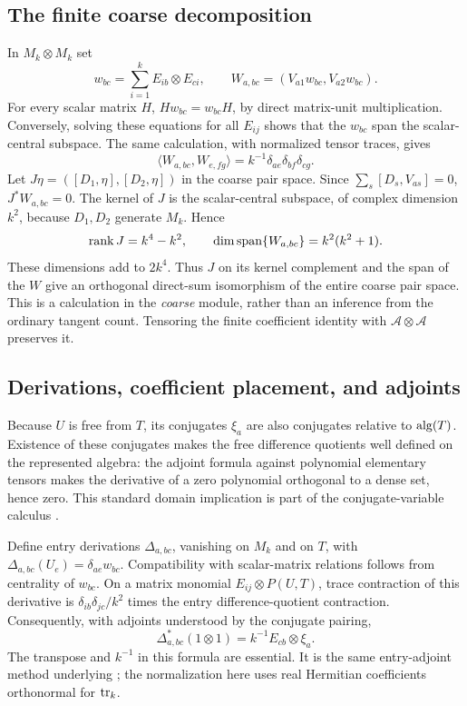 \documentclass[11pt]{article}
\theoremstyle{definition}\newtheorem{definition}[theorem]{Definition}
\theoremstyle{remark}\newtheorem{remark}[theorem]{Remark}
\begin{document}
\subsection{The finite coarse decomposition}
In $M_k\otimes M_k$ set
\[
 w_{bc}=\sum_{i=1}^k E_{ib}\otimes E_{ci},\qquad
 W_{a,bc}=(V_{a1}w_{bc},V_{a2}w_{bc}).
\]
For every scalar matrix $H$, $Hw_{bc}=w_{bc}H$, by direct
matrix-unit multiplication. Conversely, solving these equations for
all $E_{ij}$ shows that the $w_{bc}$ span the scalar-central subspace.
The same calculation, with normalized tensor traces, gives
\begin{equation}\label{eq:gram}
 \langle W_{a,bc},W_{e,fg}\rangle
 =k^{-1}\delta_{ae}\delta_{bf}\delta_{cg}.
\end{equation}
Let $J\eta=([D_1,\eta],[D_2,\eta])$ in the coarse pair space.
Since $\sum_s[D_s,V_{as}]=0$, $J^*W_{a,bc}=0$.
The kernel of $J$ is the scalar-central subspace, of complex dimension
$k^2$, because $D_1,D_2$ generate $M_k$. Hence
\[
 \operatorname{rank} J=k^4-k^2,\qquad
 \dim\operatorname{span}\{W_{a,bc}\}=k^2(k^2+1).
\]
These dimensions add to $2k^4$. Thus $J$ on its kernel complement and
the span of the $W$ give an orthogonal direct-sum isomorphism of the
entire coarse pair space. This is a calculation in the \emph{coarse}
module, rather than an inference from the ordinary tangent count.
Tensoring the finite coefficient identity with
$\mathcal A\otimes\mathcal A$ preserves it.

\subsection{Derivations, coefficient placement, and adjoints}
Because $U$ is free from $T$, its conjugates $\xi_a$ are also conjugates
relative to $\operatorname{alg}(T)$. Existence of these conjugates makes the free
difference quotients well defined on the represented algebra: the
adjoint formula against polynomial elementary tensors makes the
derivative of a zero polynomial orthogonal to a dense set, hence zero.
This standard domain implication is part of the conjugate-variable
calculus \cite{Vstar}.

Define entry derivations $\Delta_{a,bc}$, vanishing on $M_k$ and on
$T$, with
$\Delta_{a,bc}(U_e)=\delta_{ae}w_{bc}$.
Compatibility with scalar-matrix relations follows from centrality of
$w_{bc}$. On a matrix monomial $E_{ij}\otimes P(U,T)$, trace
contraction of this derivative is
$\delta_{ib}\delta_{jc}/k^2$ times the entry difference-quotient
contraction. Consequently, with adjoints understood by the conjugate
pairing,
\begin{equation}\label{eq:entry-adjoint}
 \Delta_{a,bc}^*(1\otimes1)=k^{-1}E_{cb}\otimes\xi_a.
\end{equation}
The transpose and $k^{-1}$ in this formula are essential.
It is the same entry-adjoint method underlying
\cite[Proposition 4.1]{NSSfisher}; the normalization here uses real
Hermitian coefficients orthonormal for $\operatorname{tr}_k$.
\end{document}
